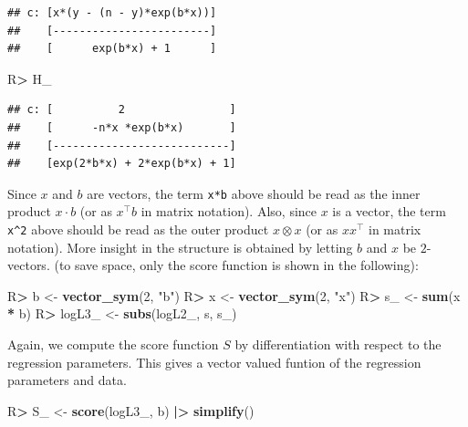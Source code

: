 \documentclass[10pt,]{article}
\newenvironment{Shaded}{\begin{snugshade}}{\end{snugshade}}
\newcommand{\DecValTok}[1]{\textcolor[rgb]{0.00,0.00,0.81}{#1}}
\newcommand{\ErrorTok}[1]{\textcolor[rgb]{0.64,0.00,0.00}{\textbf{#1}}}
\newcommand{\KeywordTok}[1]{\textcolor[rgb]{0.13,0.29,0.53}{\textbf{#1}}}
\newcommand{\NormalTok}[1]{#1}
\newcommand{\OperatorTok}[1]{\textcolor[rgb]{0.81,0.36,0.00}{\textbf{#1}}}
\newcommand{\StringTok}[1]{\textcolor[rgb]{0.31,0.60,0.02}{#1}}
\begin{document}
\begin{verbatim}
## c: [x*(y - (n - y)*exp(b*x))]
##    [------------------------]
##    [      exp(b*x) + 1      ]
\end{verbatim}

\begin{Shaded}
\begin{Highlighting}[]
\NormalTok{R}\OperatorTok{>}\StringTok{ }\NormalTok{H_}
\end{Highlighting}
\end{Shaded}

\begin{verbatim}
## c: [          2                ]
##    [      -n*x *exp(b*x)       ]
##    [---------------------------]
##    [exp(2*b*x) + 2*exp(b*x) + 1]
\end{verbatim}

Since \(x\) and \({b}\) are vectors, the term \texttt{x*b} above should
be read as the inner product \(x \cdot {b}\) (or as \(x^\top{b}\) in
matrix notation). Also, since \(x\) is a vector, the term
\texttt{x\^{}2} above should be read as the outer product
\(x \otimes x\) (or as \(x x^\top\) in matrix notation). More insight in
the structure is obtained by letting \(b\) and \(x\) be \(2\)-vectors.
(to save space, only the score function is shown in the following):

\begin{Shaded}
\begin{Highlighting}[]
\NormalTok{R}\OperatorTok{>}\StringTok{ }\NormalTok{b <-}\StringTok{ }\KeywordTok{vector_sym}\NormalTok{(}\DecValTok{2}\NormalTok{, }\StringTok{"b"}\NormalTok{)}
\NormalTok{R}\OperatorTok{>}\StringTok{ }\NormalTok{x <-}\StringTok{ }\KeywordTok{vector_sym}\NormalTok{(}\DecValTok{2}\NormalTok{, }\StringTok{"x"}\NormalTok{)}
\NormalTok{R}\OperatorTok{>}\StringTok{ }\NormalTok{s_ <-}\StringTok{ }\KeywordTok{sum}\NormalTok{(x }\OperatorTok{*}\StringTok{ }\NormalTok{b)}
\NormalTok{R}\OperatorTok{>}\StringTok{ }\NormalTok{logL3_ <-}\StringTok{ }\KeywordTok{subs}\NormalTok{(logL2_, s, s_)}
\end{Highlighting}
\end{Shaded}

Again, we compute the score function \(S\) by differentiation with
respect to the regression parameters. This gives a vector valued funtion
of the regression parameters and data.

\begin{Shaded}
\begin{Highlighting}[]
\NormalTok{R}\OperatorTok{>}\StringTok{ }\NormalTok{S_ <-}\StringTok{ }\KeywordTok{score}\NormalTok{(logL3_, b) }\OperatorTok{|}\ErrorTok{>}\StringTok{ }\KeywordTok{simplify}\NormalTok{()}
\end{Highlighting}
\end{Shaded}
\end{document}
